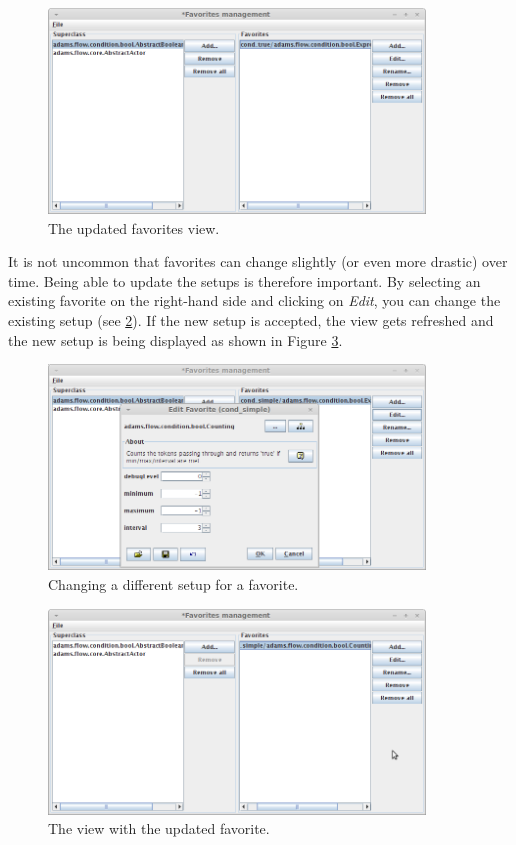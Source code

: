 \begin{figure}[htb]
  \centering
  \includegraphics[width=10.0cm]{images/favoritesmanagement-addsuper4.png}
  \caption{The updated favorites view.}
  \label{favoritesmanagement-addsuper4}
\end{figure}

\clearpage
{}
It is not uncommon that favorites can change slightly (or even more drastic)
over time. Being able to update the setups is therefore important. By selecting
an existing favorite on the right-hand side and clicking on \textit{Edit}, you
can change the existing setup (see \ref{favoritesmanagement-edit1}). If the
new setup is accepted, the view gets refreshed and the new setup is being
displayed as shown in Figure \ref{favoritesmanagement-edit2}.

\begin{figure}[htb]
  \centering
  \includegraphics[width=10.0cm]{images/favoritesmanagement-edit1.png}
  \caption{Changing a different setup for a favorite.}
  \label{favoritesmanagement-edit1}
\end{figure}

\begin{figure}[htb]
  \centering
  \includegraphics[width=10.0cm]{images/favoritesmanagement-edit2.png}
  \caption{The view with the updated favorite.}
  \label{favoritesmanagement-edit2}
\end{figure}

